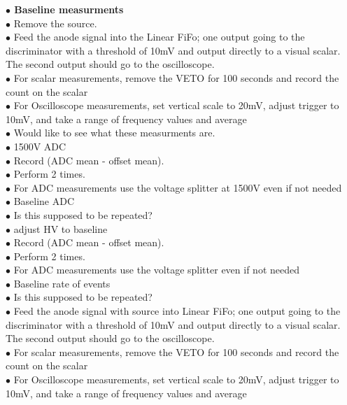 \textbf{\color[rgb]{1,0.5,0}$\bullet$ Baseline measurments}\\
$\bullet$ Remove the source.\\
$\bullet$ Feed the anode signal into the Linear FiFo; one output going to the discriminator with a threshold of 10mV and output directly to a visual scalar. The second output should go to the oscilloscope.\\
$\bullet$ For scalar measurements, remove the VETO for 100 seconds and record the count on the scalar\\
$\bullet$ For Oscilloscope measurements, set vertical scale to 20mV, adjust trigger to 10mV, and take a range of frequency values and average\\
{\color{blue}$\bullet$ Would like to see what these measurments are.}\\
$\bullet$ 1500V ADC\\
$\bullet$ Record (ADC mean - offset mean).\\
$\bullet$ Perform 2 times.\\
$\bullet$ For ADC measurements use the voltage splitter at 1500V even if not needed\\
$\bullet$ Baseline ADC\\
{\color{blue}$\bullet$ Is this supposed to be repeated?}\\
$\bullet$ adjust HV to baseline\\
$\bullet$ Record (ADC mean - offset mean).\\
$\bullet$ Perform 2 times.\\
$\bullet$ For ADC measurements use the voltage splitter even if not needed\\
$\bullet$ Baseline rate of events\\
{\color{blue}$\bullet$ Is this supposed to be repeated?}\\
$\bullet$ Feed the anode signal with source into Linear FiFo; one output going to the discriminator with a threshold of 10mV and output directly to a visual scalar. The second output should go to the oscilloscope.\\
$\bullet$ For scalar measurements, remove the VETO for 100 seconds and record the count on the scalar\\
$\bullet$ For Oscilloscope measurements, set vertical scale to 20mV, adjust trigger to 10mV, and take a range of frequency values and average\\

